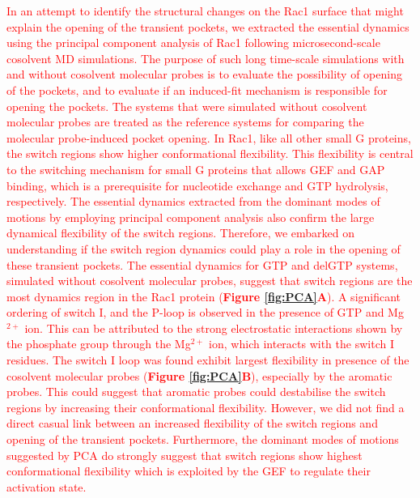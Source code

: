 \documentclass[12pt,a4paper]{achemso}
\begin{document}
\textcolor{red}{In an attempt to identify the structural changes on the Rac1 surface that might explain the opening of the transient pockets, we extracted the essential dynamics using the principal component analysis of Rac1 following microsecond-scale cosolvent MD simulations. The purpose of such long time-scale simulations with and without \textcolor{red}{cosolvent molecular probes} is to evaluate the possibility of opening of the pockets, and to evaluate if an induced-fit mechanism is responsible for opening the pockets. The systems that were simulated without \textcolor{red}{cosolvent molecular probes} are treated as the reference systems for comparing the molecular probe-induced pocket opening.  In Rac1, like all other small G proteins, the switch regions show higher conformational flexibility. This flexibility is central to the switching mechanism for small G proteins that allows GEF and GAP binding, which is a prerequisite for nucleotide exchange and GTP hydrolysis, respectively.  The essential dynamics extracted from the dominant modes of motions by employing principal component analysis also confirm the large dynamical flexibility of the switch regions.  Therefore, we embarked on understanding if the switch region dynamics could play a role in the opening of these transient pockets. The essential dynamics for GTP and delGTP systems, simulated without cosolvent molecular probes, suggest that switch regions are the most dynamics region in the Rac1 protein (\textbf{Figure \ref{fig:PCA}A}). A significant ordering of switch I, and the P-loop is observed in the presence of GTP and Mg$^{2+}$ ion. This can be attributed to the strong electrostatic interactions shown by the phosphate group through the  Mg$^{2+}$ ion, which interacts with the switch I residues. The switch I loop was found exhibit largest flexibility in presence of the cosolvent molecular probes (\textbf{Figure \ref{fig:PCA}B}), especially by the aromatic probes. This could suggest that aromatic probes could destabilise the switch regions by increasing their conformational flexibility. However, we did not find a direct casual link between an increased flexibility of the switch regions and opening of the transient pockets. Furthermore, the dominant modes of motions suggested by PCA do strongly suggest that switch regions show highest conformational flexibility which is exploited by the GEF to regulate their activation state.}
\end{document}

